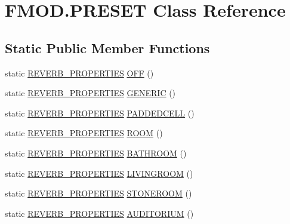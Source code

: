 \hypertarget{class_f_m_o_d_1_1_p_r_e_s_e_t}{}\section{F\+M\+O\+D.\+P\+R\+E\+S\+ET Class Reference}
\label{class_f_m_o_d_1_1_p_r_e_s_e_t}
\subsection*{Static Public Member Functions}
\begin{DoxyCompactItemize}
\item 
static \hyperlink{struct_f_m_o_d_1_1_r_e_v_e_r_b___p_r_o_p_e_r_t_i_e_s}{R\+E\+V\+E\+R\+B\+\_\+\+P\+R\+O\+P\+E\+R\+T\+I\+ES} \hyperlink{class_f_m_o_d_1_1_p_r_e_s_e_t_a97c0406d633e3fa3159c9f4787d5144b}{O\+FF} ()
\item 
static \hyperlink{struct_f_m_o_d_1_1_r_e_v_e_r_b___p_r_o_p_e_r_t_i_e_s}{R\+E\+V\+E\+R\+B\+\_\+\+P\+R\+O\+P\+E\+R\+T\+I\+ES} \hyperlink{class_f_m_o_d_1_1_p_r_e_s_e_t_a278c39a93034cdf2092728b2af39a883}{G\+E\+N\+E\+R\+IC} ()
\item 
static \hyperlink{struct_f_m_o_d_1_1_r_e_v_e_r_b___p_r_o_p_e_r_t_i_e_s}{R\+E\+V\+E\+R\+B\+\_\+\+P\+R\+O\+P\+E\+R\+T\+I\+ES} \hyperlink{class_f_m_o_d_1_1_p_r_e_s_e_t_a8ab601e61b8a92d984f838999ac3e5ff}{P\+A\+D\+D\+E\+D\+C\+E\+LL} ()
\item 
static \hyperlink{struct_f_m_o_d_1_1_r_e_v_e_r_b___p_r_o_p_e_r_t_i_e_s}{R\+E\+V\+E\+R\+B\+\_\+\+P\+R\+O\+P\+E\+R\+T\+I\+ES} \hyperlink{class_f_m_o_d_1_1_p_r_e_s_e_t_a8381d1df80b9f43f77a54a100ffc116d}{R\+O\+OM} ()
\item 
static \hyperlink{struct_f_m_o_d_1_1_r_e_v_e_r_b___p_r_o_p_e_r_t_i_e_s}{R\+E\+V\+E\+R\+B\+\_\+\+P\+R\+O\+P\+E\+R\+T\+I\+ES} \hyperlink{class_f_m_o_d_1_1_p_r_e_s_e_t_aa1baf1d0a506b811d5a914fecf6d4419}{B\+A\+T\+H\+R\+O\+OM} ()
\item 
static \hyperlink{struct_f_m_o_d_1_1_r_e_v_e_r_b___p_r_o_p_e_r_t_i_e_s}{R\+E\+V\+E\+R\+B\+\_\+\+P\+R\+O\+P\+E\+R\+T\+I\+ES} \hyperlink{class_f_m_o_d_1_1_p_r_e_s_e_t_a1816472cd37476ded50f6539e2f74a74}{L\+I\+V\+I\+N\+G\+R\+O\+OM} ()
\item 
static \hyperlink{struct_f_m_o_d_1_1_r_e_v_e_r_b___p_r_o_p_e_r_t_i_e_s}{R\+E\+V\+E\+R\+B\+\_\+\+P\+R\+O\+P\+E\+R\+T\+I\+ES} \hyperlink{class_f_m_o_d_1_1_p_r_e_s_e_t_ad9b05728a49866ebfc5d822a392b4001}{S\+T\+O\+N\+E\+R\+O\+OM} ()
\item 
static \hyperlink{struct_f_m_o_d_1_1_r_e_v_e_r_b___p_r_o_p_e_r_t_i_e_s}{R\+E\+V\+E\+R\+B\+\_\+\+P\+R\+O\+P\+E\+R\+T\+I\+ES} \hyperlink{class_f_m_o_d_1_1_p_r_e_s_e_t_ae490944fdd4e2cc3baea2e82d425d6c7}{A\+U\+D\+I\+T\+O\+R\+I\+UM} ()

\end{DoxyCompactItemize}
